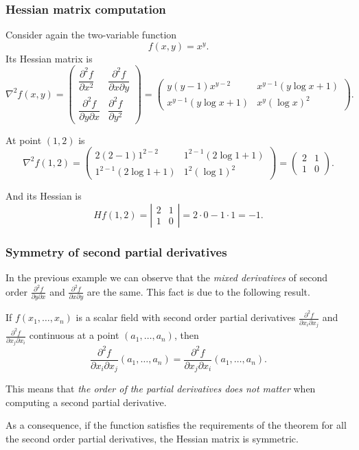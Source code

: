 \begin{frame}
\frametitle{Hessian matrix computation}
Consider again the two-variable function
\[f(x,y)=x^y.\]
Its Hessian matrix is
\[
\nabla^2f(x,y)=\left(
\begin{array}{cc}
\dfrac{\partial^2 f}{\partial x^2} & \dfrac{\partial^2 f}{\partial x \partial y}\\
\dfrac{\partial^2 f}{\partial y \partial x} & \dfrac{\partial^2 f}{\partial y^2}
\end{array}
\right)
=
\left(
\begin{array}{cc}
y(y-1)x^{y-2} & x^{y-1}(y\log x+1) \\
x^{y-1}(y\log x+1) & x^y(\log x)^2
\end{array}
\right).
\]

At point $(1,2)$ is
\[
\nabla^2f(1,2)=\left(
\begin{array}{cc}
2(2-1)1^{2-2} & 1^{2-1}(2\log 1+1) \\
1^{2-1}(2\log 1+1) & 1^2(\log 1)^2
\end{array}
\right)
=
\left(
\begin{array}{cc}
2 & 1 \\
1 & 0
\end{array}
\right).
\]

And its Hessian is
\[
Hf(1,2)=\left|
\begin{array}{cc}
2 & 1 \\
1 & 0
\end{array}
\right|=
2\cdot 0-1\cdot1= -1.
\]
\end{frame}


\begin{frame}
\frametitle{Symmetry of second partial derivatives}
In the previous example we can observe that the \emph{mixed derivatives} of second order $\frac{\partial^2 f}{\partial y\partial x}$ and $\frac{\partial^2 f}{\partial x\partial y}$ are the same. 
This fact is due to the following result.

\begin{theorem}
If $f(x_1,\ldots,x_n)$ is a scalar field with second order partial derivatives $\frac{\partial^2 f}{\partial x_i\partial x_j}$ and $\frac{\partial^2 f}{\partial x_j\partial x_i}$ continuous at a point $(a_1,\ldots,a_n)$, then
\[
\frac{\partial^2 f}{\partial x_i\partial x_j}(a_1,\ldots,a_n)=\frac{\partial^2 f}{\partial x_j\partial x_i}(a_1,\ldots,a_n).
\]
\end{theorem}

This means that \alert{\emph{the order of the partial derivatives does not matter}} when computing a second partial derivative.

As a consequence, if the function satisfies the requirements of the theorem for all the second order partial derivatives, the Hessian matrix is symmetric. 
\end{frame}


